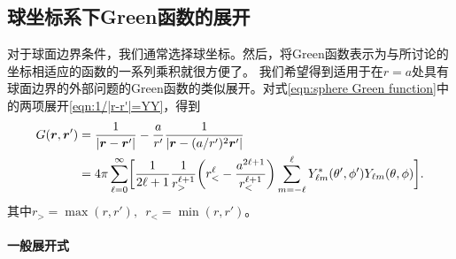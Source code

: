 \subsection{球坐标系下Green函数的展开}
\label{ssec:Green expansion in spherical coordinate}

对于球面边界条件，我们通常选择球坐标。然后，将Green函数表示为与所讨论的坐标相适应的函数的一系列乘积就很方便了。
我们希望得到适用于在$r = a$处具有球面边界的外部问题的Green函数的类似展开。对式\eqref{eqn:sphere Green function}中的两项展开\eqref{eqn:1/|r-r'|=YY}，得到
\begin{align}
    \notag
    G(\bm r,\bm r') &= \frac1{\lvert\bm r - \bm r'\rvert} - \frac a{r'}\frac1{\lvert\bm r - (a/r')^2\bm r'\rvert}\\
    \label{eqn:Green YY}
    &= 4\pi\sum_{\ell=0}^\infty\biggl[\frac1{2\ell + 1}\frac1{r_>^{\ell+1}}\biggl(r_<^\ell - \frac{a^{2\ell+1}}{r_<^{\ell+1}}\biggr)\sum_{m=-\ell}^\ell Y_{\ell m}^\ast(\theta',\phi')Y_{\ell m}(\theta,\phi)\biggr].
\end{align}
其中$r_> = \max(r,r'),\enspace r_< = \min(r,r')$。%

\paragraph{一般展开式}

